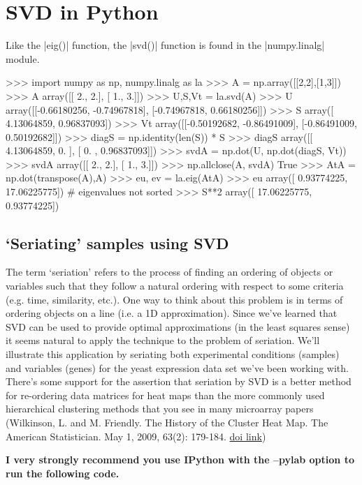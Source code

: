 \section*{SVD in Python}

Like the |eig()| function, the |svd()| function is found in the |numpy.linalg| module.

\begin{python}
>>> import numpy as np, numpy.linalg as la
>>> A = np.array([[2,2],[1,3]])
>>> A
array([[ 2.,  2.],
       [ 1.,  3.]])
>>> U,S,Vt = la.svd(A)
>>> U
array([[-0.66180256, -0.74967818],
       [-0.74967818,  0.66180256]])
>>> S
array([ 4.13064859,  0.96837093])
>>> Vt
array([[-0.50192682, -0.86491009],
       [-0.86491009,  0.50192682]])
>>> diagS = np.identity(len(S)) * S
>>> diagS
array([[ 4.13064859,  0.        ],
       [ 0.        ,  0.96837093]])
>>> svdA = np.dot(U, np.dot(diagS, Vt))
>>> svdA
array([[ 2.,  2.],
       [ 1.,  3.]])
>>> np.allclose(A, svdA)
True
>>> AtA = np.dot(transpose(A),A)
>>> eu, ev = la.eig(AtA)
>>> eu
array([  0.93774225,  17.06225775]) # eigenvalues not sorted
>>> S**2
array([ 17.06225775,   0.93774225])
\end{python}


\subsection*{`Seriating' samples using SVD}

The term `seriation' refers to the process of finding an ordering of objects or variables such that they follow a natural ordering with respect to some criteria (e.g. time, similarity, etc.). One way to think about this problem is in terms of ordering objects on a line (i.e. a 1D approximation).  Since we've learned that SVD can be used to provide optimal approximations (in the least squares sense) it seems natural to apply the technique to the problem of seriation. We'll illustrate this application by seriating both experimental conditions (samples) and variables (genes) for the yeast expression data set we've been working with.  There's some support for the assertion that seriation by SVD is a better method for re-ordering data matrices for heat maps than the more commonly used hierarchical clustering methods that you see in many microarray papers (Wilkinson, L. and M. Friendly. The History of the Cluster Heat Map. The American Statistician. May 1, 2009, 63(2): 179-184. \href{http://dx.doi.org/10.1198/tas.2009.0033}{doi link}) 

{\color{red} \bfseries I very strongly recommend you use IPython with the --pylab option to run the following code.}

